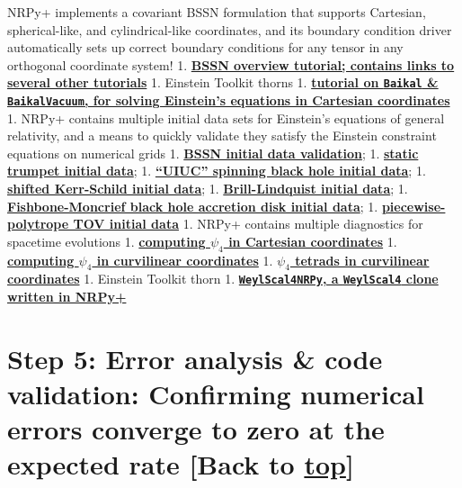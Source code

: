 \documentclass[landscape,letterpaper,10pt,english]{article}
\begin{document}
NRPy+ implements a covariant BSSN formulation that supports Cartesian,
spherical-like, and cylindrical-like coordinates, and its boundary
condition driver automatically sets up correct boundary conditions for
any tensor in any orthogonal coordinate system! 1.
\href{Tutorial-BSSN_formulation.ipynb}{\textbf{BSSN overview tutorial;
contains links to several other tutorials}} 1. Einstein Toolkit thorns
1. \href{Tutorial-BaikalETK.ipynb}{\textbf{tutorial on \texttt{Baikal}
\& \texttt{BaikalVacuum}, for solving Einstein's equations in Cartesian
coordinates}} 1. NRPy+ contains multiple initial data sets for
Einstein's equations of general relativity, and a means to quickly
validate they satisfy the Einstein constraint equations on numerical
grids 1.
\href{Tutorial-Start_to_Finish-BSSNCurvilinear-Setting_up_Exact_Initial_Data.ipynb}{\textbf{BSSN
initial data validation}}; 1.
\href{Tutorial-ADM_Initial_Data-StaticTrumpet.ipynb}{\textbf{static
trumpet initial data}}; 1.
\href{Tutorial-ADM_Initial_Data-UIUC_BlackHole.ipynb}{\textbf{``UIUC''
spinning black hole initial data}}; 1.
\href{Tutorial-ADM_Initial_Data-ShiftedKerrSchild.ipynb}{\textbf{shifted
Kerr-Schild initial data}}; 1.
\href{Tutorial-ADM_Initial_Data-Brill-Lindquist.ipynb}{\textbf{Brill-Lindquist
initial data}}; 1.
\href{Tutorial-FishboneMoncriefID.ipynb}{\textbf{Fishbone-Moncrief black
hole accretion disk initial data}}; 1.
\href{Tutorial-ADM_Initial_Data-TOV.ipynb}{\textbf{piecewise-polytrope
TOV initial data}} 1. NRPy+ contains multiple diagnostics for spacetime
evolutions 1.
\href{Tutorial-WeylScalarsInvariants-Cartesian.ipynb}{\textbf{computing
\(\psi_4\) in Cartesian coordinates}} 1.
\href{Tutorial-Psi4.ipynb}{\textbf{computing \(\psi_4\) in curvilinear
coordinates}} 1. \href{Tutorial-Psi4_tetrads.ipynb}{\textbf{\(\psi_4\)
tetrads in curvilinear coordinates}} 1. Einstein Toolkit thorn 1.
\href{Tutorial-ETK_thorn-Weyl_Scalars_and_Spacetime_Invariants.ipynb}{\textbf{\texttt{WeylScal4NRPy},
a \texttt{WeylScal4} clone written in NRPy+}}

    \hypertarget{step-5-error-analysis-code-validation-confirming-numerical-errors-converge-to-zero-at-the-expected-rate-back-to-top}{%
\section{\texorpdfstring{Step 5: Error analysis \& code validation:
Confirming numerical errors converge to zero at the expected rate
{[}Back to
\hyperref[toc]{top}{]}}{Step 5: Error analysis \& code validation: Confirming numerical errors converge to zero at the expected rate {[}Back to {]}}}\label{step-5-error-analysis-code-validation-confirming-numerical-errors-converge-to-zero-at-the-expected-rate-back-to-top}}
\end{document}
